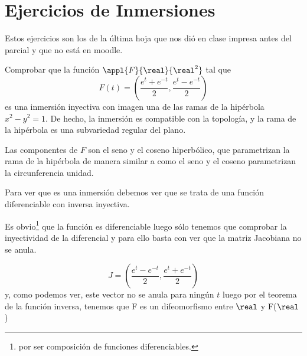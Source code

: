 \section{Ejercicios de Inmersiones}

Estos ejercicios son los de la última hoja que nos dió en clase impresa antes del parcial y que no está en moodle.

\begin{problem}[1]
Comprobar que la función $\appl{F}{\real}{\real^2}$ tal que
\[F(t)=\left( \frac{e^t+e^{-t}}{2}, \frac{e^t-e^{-t}}{2}\right)\]
es una inmersión inyectiva con imagen una de las ramas de la hipérbola $x^2-y^2=1$. De hecho, la inmersión es compatible con la topología, y la rama de la hipérbola es una subvariedad regular del plano.

Las componentes de $F$ son el seno y el coseno hiperbólico, que parametrizan la rama de la hipérbola de manera similar a como el seno y el coseno parametrizan la circunferencia unidad.

\solution


Para ver que es una inmersión debemos ver que se trata de una función diferenciable con inversa inyectiva.

Es obvio\footnote{por ser composición de funciones diferenciables.} que la función es diferenciable luego sólo tenemos que comprobar la inyectividad de la diferencial y para ello basta con ver que la matriz Jacobiana no se anula.

\[ J=\left( \frac{e^t-e^{-t}}{2}, \frac{e^t+e^{-t}}{2}\right)\]
y, como podemos ver, este vector no se anula para ningún $t$ luego por el teorema de la función inversa, tenemos que F es un difeomorfismo entre $\real$ y F($\real$)

\end{problem}

